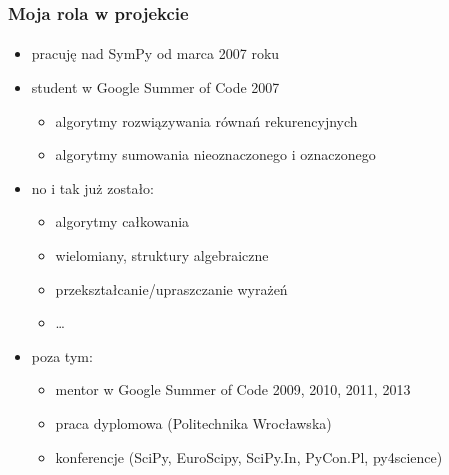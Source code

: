 \documentclass[10pt]{beamer}
\begin{document}
\begin{frame}
  \frametitle{Moja rola w projekcie}
  \framesubtitle{}

  \begin{itemize}
    \item pracuję nad SymPy od marca 2007 roku
    \item student w Google Summer of Code 2007
      \begin{itemize}
        \item algorytmy rozwiązywania równań rekurencyjnych
        \item algorytmy sumowania nieoznaczonego i oznaczonego
      \end{itemize}
    \item no i tak już zostało:
      \begin{itemize}
        \item algorytmy całkowania
        \item wielomiany, struktury algebraiczne
        \item przekształcanie/upraszczanie wyrażeń
        \item \ldots
      \end{itemize}
    \item poza tym:
      \begin{itemize}
        \item mentor w Google Summer of Code 2009, 2010, 2011, 2013
        \item praca dyplomowa (Politechnika Wrocławska)
        \item konferencje (SciPy, EuroScipy, SciPy.In, PyCon.Pl, py4science)
      \end{itemize}
  \end{itemize}
\end{frame}
\end{document}
